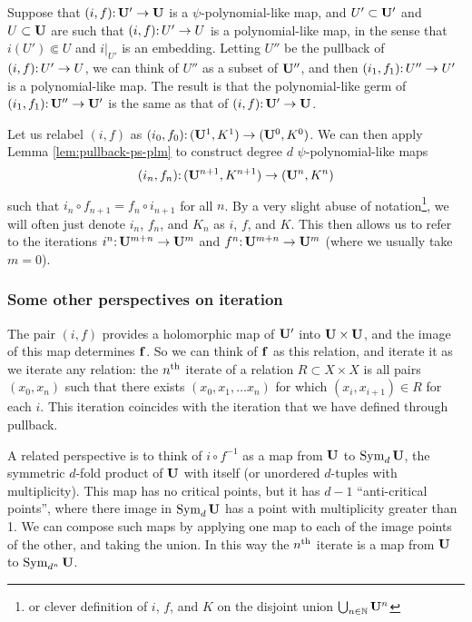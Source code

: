 Suppose that $(i, f)\mathpunct: \mathbf U' \to \mathbf U$ is a $\psi$-polynomial-like map,
and $U' \subset \mathbf U'$ and $U \subset \mathbf U$ are such that $(i, f)\mathpunct: U' \to U$ is a polynomial-like map,
in the sense that $i(U') \Subset U$ and $i|_{U'}$ is an embedding.
Letting $U''$ be the pullback of $(i, f)\mathpunct: U' \to U$, 
we can think of $U''$ as a subset of $\mathbf U''$,
and then $(i_1, f_1)\mathpunct: U'' \to U'$ is a polynomial-like map.
The result is that the polynomial-like germ of $(i_1, f_1)\mathpunct: \mathbf U''\to \mathbf U'$ is the same as that of $(i, f)\mathpunct: \mathbf U' \to \mathbf U$. 

Let us relabel $(i, f)$ as $(i_0, f_0)\mathpunct: (\mathbf U^1, K^1) \to (\mathbf U^0, K^0)$.
We can then apply Lemma \ref{lem:pullback-ps-plm} to construct degree $d$ $\psi$-polynomial-like maps
$$(i_n, f_n)\mathpunct: (\mathbf U^{n+1}, K^{n+1}) \to (\mathbf U^n, K^n)$$ such that
$i_n \circ f_{n+1} = f_n \circ i_{n+1}$ for all $n$. 
By a very slight abuse of notation\footnote{or clever definition of $i$, $f$, and $K$ on the disjoint union $\bigcup_{n\in {\Bbb N}}\mathbf U^n$},
we will often just denote $i_n$, $f_n$, and $K_n$ as $i$, $f$, and $K$.
This then allows us to refer to the iterations $i^n\mathpunct: \mathbf U^{m+n} \to \mathbf U^{m}$ and $f^n\mathpunct: \mathbf U^{m+n} \to \mathbf U^{m}$ (where we usually take $m=0$).

\subsubsection{Some other perspectives on iteration}
The pair $(i, f)$ provides a holomorphic map of $\mathbf U'$ into $\mathbf U \times \mathbf U$, and the image of this map determines $\mathbf f$.
So we can think of $\mathbf f$ as this relation, and iterate it as we iterate any relation: the $n^{\text{th}}$ iterate of a relation $R \subset X \times X$ is all pairs $(x_0, x_n)$ such that there exists $(x_0, x_1, \ldots x_n)$ for which $(x_i, x_{i+1}) \in R$ for each $i$. 
This iteration coincides with the iteration that we have defined through pullback.

A related perspective is to think of $i \circ f^{-1}$ as a map from $\mathbf U$ to $\operatorname{Sym}_d \mathbf U$, the symmetric $d$-fold product of $\mathbf U$ with itself (or unordered $d$-tuples with multiplicity).
This map has no critical points, but it has $d-1$ ``anti-critical points'', where there image in $\operatorname{Sym}_d \mathbf U$ has a point with multiplicity greater than 1. We can compose such maps by applying one map to each of the image points of the other, and taking the union. In this way the $n^{\text{th}}$ iterate is a map from $\mathbf U$ to $\operatorname{Sym}_{d^n}\mathbf U$. 




